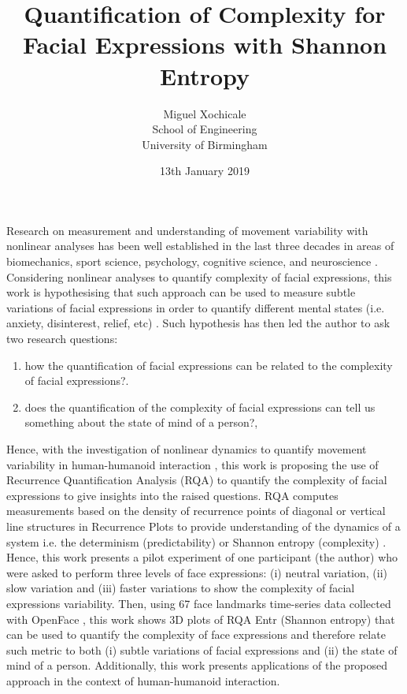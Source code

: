 \documentclass[12pt]{article}
\title{
Quantification of Complexity for \\
Facial Expressions with Shannon Entropy
}
\author{Miguel Xochicale \\
School of Engineering \\
University of Birmingham}
\date{13th January 2019}
\begin{document}
\maketitle




Research on measurement and understanding of movement variability 
with nonlinear analyses has been well established in the last three 
decades in areas of biomechanics, sport science, psychology, cognitive science,
and neuroscience \cite{davids2003}.
Considering nonlinear analyses to quantify complexity of 
facial expressions,
this work is hypothesising that such approach can be used to measure 
subtle variations of facial expressions in order to quantify 
different mental states (i.e. anxiety, disinterest, relief, etc) \cite{back2014}.
Such hypothesis has then led the author to ask two research questions: 
\begin{enumerate}[label=(\roman*)]
\item how the quantification of facial expressions can be related to  
	the complexity of facial expressions?.
\item does the quantification of the complexity of facial expressions 
	can tell us something about the state of mind of a person?, 
\end{enumerate}

Hence, with the investigation of nonlinear dynamics to 
quantify movement variability in human-humanoid interaction 
\cite{XochicalePhDThesis2018}, this work is proposing 
the use of Recurrence Quantification Analysis (RQA) 
to quantify the complexity of facial expressions to give 
insights into the raised questions.
RQA computes measurements based on the density of 
recurrence points of diagonal or vertical line 
structures in Recurrence Plots to provide understanding 
of the dynamics of a system i.e. 
the determinism (predictability) or 
Shannon entropy (complexity) \cite{marwan2007}.
Hence, this work presents a pilot experiment of one participant (the author) 
who were asked to perform three levels of 
face expressions:
(i) neutral variation, (ii) slow variation and (iii) faster variations
to show the complexity of facial expressions variability.
Then, using 67 face landmarks time-series data collected 
with OpenFace \cite{baltrusaitis2018}, this work shows 3D plots
of RQA Entr (Shannon entropy) that can be used to quantify the 
complexity of face expressions and therefore relate such metric 
to both (i) subtle variations of facial expressions 
and (ii) the state of mind of a person. Additionally,
this work presents applications of the proposed
approach in the context of human-humanoid interaction. 



\end{document}
